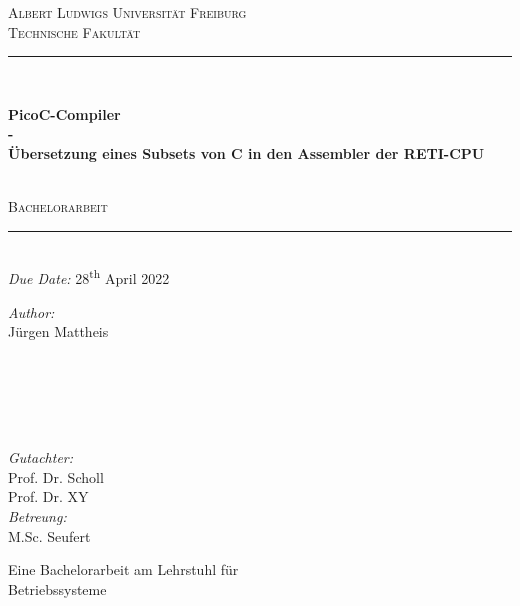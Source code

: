 \documentclass{scrreprt}
\begin{document}
  \begin{titlepage}
    \vspace{1cm}
    \center
    \textsc{\LARGE Albert Ludwigs Universität Freiburg}\\[0.5cm]
    \textsc{\Large Technische Fakultät}\\[2.0cm]

    \rule{\linewidth}{0.5mm}\\[0.4cm]
      {\huge \bfseries PicoC-Compiler\\\LARGE-\\ Übersetzung eines Subsets von C in den Assembler der RETI-CPU\par}\\[0.4cm]
      \textsc{\large Bachelorarbeit}\\
      \rule{\linewidth}{0.5mm}\\[0.5cm]

    {\large \emph{Due Date:} 28\textsuperscript{th} April 2022}\\[2.5cm]

    \begin{minipage}{0.45\textwidth}
      \begin{flushleft} \large
        \emph{Author:}\\
        Jürgen Mattheis\\
        \hspace{1cm}\\
        \hspace{1cm}\\
        \hspace{1cm}\\
        \hspace{1cm}
      \end{flushleft}
    \end{minipage}
    ~
    \begin{minipage}{0.45\textwidth}
      \begin{flushright} \large
        \emph{Gutachter:}\\
        Prof. Dr. Scholl\\
        Prof. Dr. XY\\[0.64cm]
        \emph{Betreung:}\\
        M.Sc. Seufert\\
      \end{flushright}
    \end{minipage}

    \vspace{9.5cm}
    \large{Eine Bachelorarbeit am Lehrstuhl für}\\
    \large{Betriebssysteme}
  \end{titlepage}
  \tableofcontents
\end{document}
